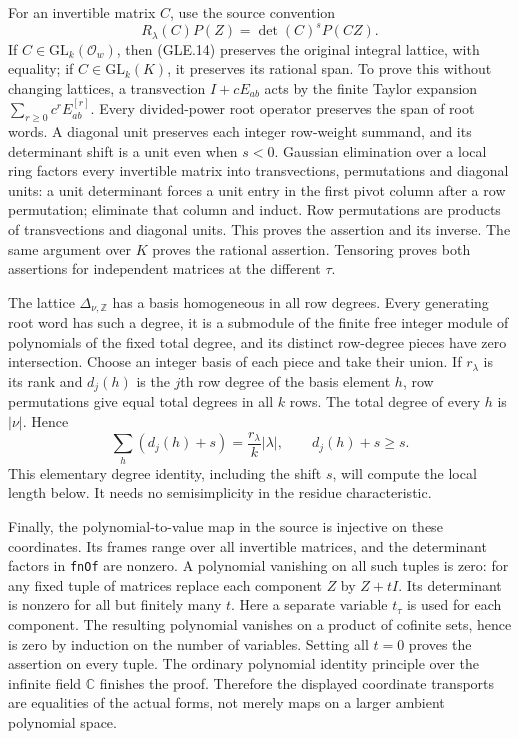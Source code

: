 For an invertible matrix $C$, use the source convention
\[
 R_\lambda(C)P(Z)=\det(C)^s P(CZ).                 \tag{GLE.14}
\]
If $C\in\mathrm{GL}_k(\mathcal O_w)$, then (GLE.14) preserves the
original integral lattice, with equality; if $C\in\mathrm{GL}_k(K)$,
it preserves its rational span.  To prove this without changing
lattices, a transvection $I+cE_{ab}$ acts by the finite Taylor expansion
$\sum_{r\ge0}c^r E_{ab}^{[r]}$.  Every divided-power root operator
preserves the span of root words.  A diagonal unit preserves each
integer row-weight summand, and its determinant shift is a unit even
when $s<0$.  Gaussian elimination over a local ring factors every
invertible matrix into transvections, permutations and diagonal units:
a unit determinant forces a unit entry in the first pivot column after
a row permutation; eliminate that column and induct.  Row permutations
are products of transvections and diagonal units.  This proves the
assertion and its inverse.  The same argument over $K$ proves the
rational assertion.  Tensoring proves both assertions for independent
matrices at the different $\tau$.

The lattice $\Delta_{\nu,\mathbb Z}$ has a basis homogeneous in all row
degrees.  Every generating root word has such a degree, it is a
submodule of the finite free integer module of polynomials of the
fixed total degree, and its distinct row-degree pieces have zero
intersection.  Choose an integer basis of each piece and take their
union.  If $r_\lambda$ is its rank and $d_j(h)$ is the $j$th row degree
of the basis element $h$, row permutations give equal total degrees
in all $k$ rows.  The total degree of every $h$ is $|\nu|$.  Hence
\[
 \sum_h(d_j(h)+s)=\frac{r_\lambda}{k}|\lambda|,
 \qquad d_j(h)+s\ge s.                            \tag{GLE.15}
\]
This elementary degree identity, including the shift $s$, will compute
the local length below.  It needs no semisimplicity in the residue
characteristic.

Finally, the polynomial-to-value map in the source is injective on
these coordinates.  Its frames range over all invertible matrices,
and the determinant factors in \texttt{fnOf} are nonzero.  A polynomial
vanishing on all such tuples is zero: for any fixed tuple of matrices
replace each component $Z$ by $Z+tI$.  Its determinant is nonzero for
all but finitely many $t$.  Here a separate variable $t_\tau$ is used
for each component.  The resulting polynomial vanishes on a product
of cofinite sets, hence is zero by induction on the number of
variables.  Setting all $t=0$ proves the assertion on every tuple.
The ordinary polynomial identity principle over the infinite field
$\mathbb C$ finishes the proof.  Therefore the displayed coordinate
transports are equalities of the actual forms, not merely maps on a
larger ambient polynomial space.

